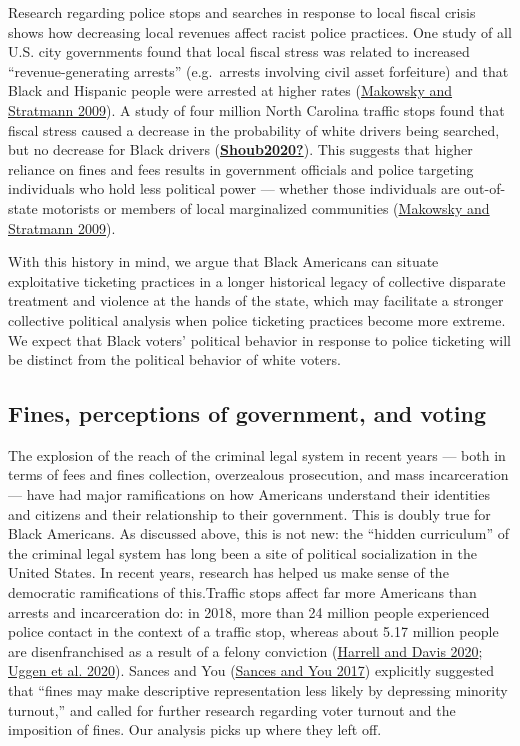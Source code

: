 \documentclass[
  12pt,
]{article}
\begin{document}
Research regarding police stops and searches in response to local fiscal crisis shows how decreasing local revenues affect racist police practices. One study of all U.S. city governments found that local fiscal stress was related to increased ``revenue-generating arrests'' (e.g.~arrests involving civil asset forfeiture) and that Black and Hispanic people were arrested at higher rates (\protect\hyperlink{ref-Makowsky2009}{Makowsky and Stratmann 2009}). A study of four million North Carolina traffic stops found that fiscal stress caused a decrease in the probability of white drivers being searched, but no decrease for Black drivers (\protect\hyperlink{ref-Shoub2020}{\textbf{Shoub2020?}}). This suggests that higher reliance on fines and fees results in government officials and police targeting individuals who hold less political power --- whether those individuals are out-of-state motorists or members of local marginalized communities (\protect\hyperlink{ref-Makowsky2009}{Makowsky and Stratmann 2009}).

With this history in mind, we argue that Black Americans can situate exploitative ticketing practices in a longer historical legacy of collective disparate treatment and violence at the hands of the state, which may facilitate a stronger collective political analysis when police ticketing practices become more extreme. We expect that Black voters' political behavior in response to police ticketing will be distinct from the political behavior of white voters.

\hypertarget{fines-perceptions-of-government-and-voting}{%
\subsection*{Fines, perceptions of government, and voting}\label{fines-perceptions-of-government-and-voting}}

The explosion of the reach of the criminal legal system in recent years --- both in terms of fees and fines collection, overzealous prosecution, and mass incarceration --- have had major ramifications on how Americans understand their identities and citizens and their relationship to their government. This is doubly true for Black Americans. As discussed above, this is not new: the ``hidden curriculum'' of the criminal legal system has long been a site of political socialization in the United States. In recent years, research has helped us make sense of the democratic ramifications of this.Traffic stops affect far more Americans than arrests and incarceration do: in 2018, more than 24 million people experienced police contact in the context of a traffic stop, whereas about 5.17 million people are disenfranchised as a result of a felony conviction (\protect\hyperlink{ref-Harrell2020}{Harrell and Davis 2020}; \protect\hyperlink{ref-Uggen2020}{Uggen et al. 2020}). Sances and You (\protect\hyperlink{ref-Sances2017}{Sances and You 2017}) explicitly suggested that ``fines may make descriptive representation less likely by depressing minority turnout,'' and called for further research regarding voter turnout and the imposition of fines. Our analysis picks up where they left off.
\end{document}
